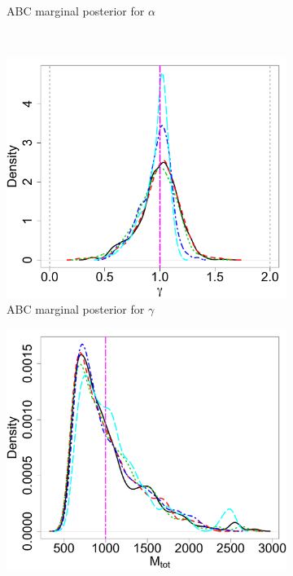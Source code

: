 \documentclass[12pt]{article}
\begin{document}
\begin{figure}[htbp]
\begin{subfigure}{0.48\textwidth}
\caption{ABC marginal posterior for  $\alpha$}\label{subfig:marg_alpha_obs} 
\end{subfigure} \\
\begin{subfigure}{0.48\textwidth}
\centering
\includegraphics[width = \textwidth]{figures/marg_gamma_obs.pdf} 
\caption{ABC marginal posterior for $\gamma$}\label{subfig:marg_gamma_obs}
\end{subfigure}
\begin{subfigure}{0.48\textwidth}
\centering
\includegraphics[width = \textwidth]{figures/marg_mtot_obs.pdf} 

\end{subfigure}
\end{figure}
\end{document}

